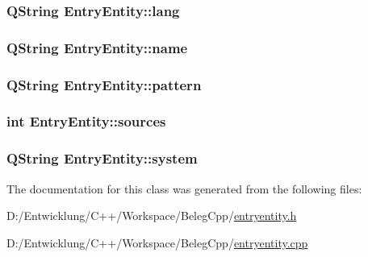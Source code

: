 \hypertarget{class_entry_entity_a5225b37537638e119ef901cad839390c}{
\subsubsection[{lang}]{\setlength{\rightskip}{0pt plus 5cm}Q\+String Entry\+Entity\+::lang\hspace{0.3cm}{\ttfamily [private]}}}\label{class_entry_entity_a5225b37537638e119ef901cad839390c}
\hypertarget{class_entry_entity_aa56cd8b59742ac7970d5344b93ae88a0}{
\subsubsection[{name}]{\setlength{\rightskip}{0pt plus 5cm}Q\+String Entry\+Entity\+::name\hspace{0.3cm}{\ttfamily [private]}}}\label{class_entry_entity_aa56cd8b59742ac7970d5344b93ae88a0}
\hypertarget{class_entry_entity_a65f0a241d2a05f7b2da01e5868acfe5c}{
\subsubsection[{pattern}]{\setlength{\rightskip}{0pt plus 5cm}Q\+String Entry\+Entity\+::pattern\hspace{0.3cm}{\ttfamily [private]}}}\label{class_entry_entity_a65f0a241d2a05f7b2da01e5868acfe5c}
\hypertarget{class_entry_entity_af12b80bb0722b8a8d596f23289b5228a}{
\subsubsection[{sources}]{\setlength{\rightskip}{0pt plus 5cm}int Entry\+Entity\+::sources\hspace{0.3cm}{\ttfamily [private]}}}\label{class_entry_entity_af12b80bb0722b8a8d596f23289b5228a}
\hypertarget{class_entry_entity_ab925c61d96e3e82745d185e931ef1e64}{
\subsubsection[{system}]{\setlength{\rightskip}{0pt plus 5cm}Q\+String Entry\+Entity\+::system\hspace{0.3cm}{\ttfamily [private]}}}\label{class_entry_entity_ab925c61d96e3e82745d185e931ef1e64}


The documentation for this class was generated from the following files\+:\begin{DoxyCompactItemize}
\item 
D\+:/\+Entwicklung/\+C++/\+Workspace/\+Beleg\+Cpp/\hyperlink{entryentity_8h}{entryentity.\+h}\item 
D\+:/\+Entwicklung/\+C++/\+Workspace/\+Beleg\+Cpp/\hyperlink{entryentity_8cpp}{entryentity.\+cpp}\end{DoxyCompactItemize}
